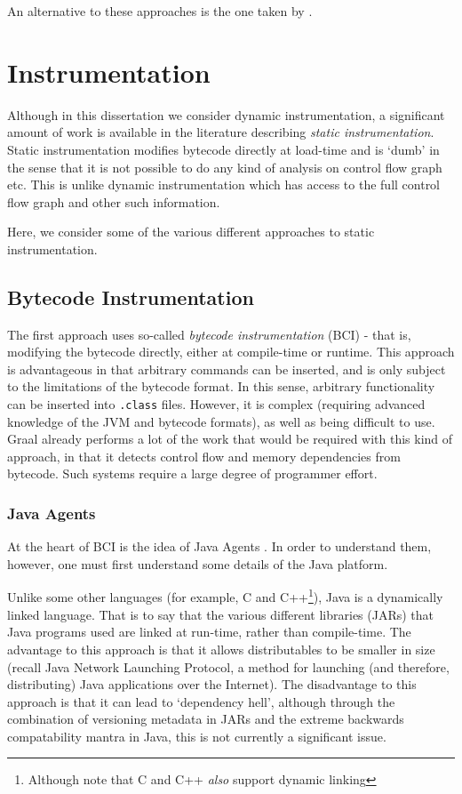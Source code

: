 \citet{Ketterlin}

\citet{Dong}

An alternative to these approaches is the one taken by \citet{Tournavitis2009}. 

\section{Instrumentation} \label{sec:related/instrumentation}
Although in this dissertation we consider dynamic instrumentation, a significant amount of work is available in the literature describing \emph{static instrumentation}. Static instrumentation modifies bytecode directly at load-time and is `dumb' in the sense that it is not possible to do any kind of analysis on control flow graph etc. This is unlike dynamic instrumentation which has access to the full control flow graph and other such information.

Here, we consider some of the various different approaches to static instrumentation.

\subsection{Bytecode Instrumentation} \label{sec:instrumentation/bytecode-instr}
The first approach uses so-called \textit{bytecode instrumentation} (BCI) - that is, modifying the bytecode directly, either at compile-time or runtime. This approach is advantageous in that arbitrary commands can be inserted, and is only subject to the limitations of the bytecode format. In this sense, arbitrary functionality can be inserted into \texttt{.class} files. However, it is complex (requiring advanced knowledge of the JVM and bytecode formats), as well as being difficult to use. Graal already performs a lot of the work that would be required with this kind of approach, in that it detects control flow and memory dependencies from bytecode. Such systems require a large degree of programmer effort.

	\subsubsection{Java Agents} \label{sec:instrumentation/bytecode-instr/agents}
	At the heart of BCI is the idea of Java Agents \citep{javaagents}. In order to understand them, however, one must first understand some details of the Java platform.
		
	Unlike some other languages (for example, C and C++\footnote{Although note that C and C++ \emph{also} support dynamic linking}), Java is a dynamically linked language. That is to say that the various different libraries (JARs) that Java programs used are linked at run-time, rather than compile-time. The advantage to this approach is that it allows distributables to be smaller in size (recall Java Network Launching Protocol, a method for launching (and therefore, distributing) Java applications over the Internet). The disadvantage to this approach is that it can lead to `dependency hell', although through the combination of versioning metadata in JARs and the extreme backwards compatability mantra in Java, this is not currently a significant issue.
		
